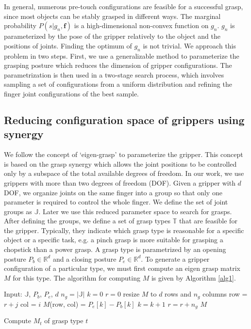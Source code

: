 In general, numerous pre-touch configurations are feasible for a successful grasp, since most objects can be stably grasped in different ways. The marginal probability $P(s|g_n,\bm{f})$ is a high-dimensional non-convex function on $g_n$. $g_n$ is parameterized by the pose of the gripper relatively to the object and the positions of joints. Finding the optimum of $g_n$ is not trivial. We approach this problem in two steps. First, we use a generalizable method to parameterize the grasping posture which reduces the dimension of gripper configurations. The parametrization is then used in a two-stage search process, which involves sampling a set of configurations from a uniform distribution and refining the finger joint configurations of the best sample.    

\subsection{Reducing configuration space of grippers using synergy }\label{sec:gripper_parametrization}

We follow the concept of `eigen-grasp'\cite{Ciocarlie2009} to parameterize the gripper. This concept is based on the grasp synergy which allows the joint positions to be controlled only by a subspace of the total available degrees of freedom. In our work, we use grippers with more than two degrees of freedom (DOF). Given a gripper with $d$ DOF, we organize joints on the same finger into a group so that only one parameter is required to control the whole finger. We define the set of joint groups as $\mathbb{J}$. Later we use this reduced parameter space to search for grasps. After defining the groups, we define a set of grasp types $\mathbb{T}$ that are feasible for the gripper. Typically, they indicate which grasp type is reasonable for a specific object or a specific task, e.g. a pinch grasp is more suitable for grasping a chopstick than a power grasp. A grasp type is parametrized by an opening posture $P_b \in\mathbb{R}^d$  and a closing posture $P_e \in\mathbb{R}^d$. To generate a gripper configuration of a particular type, we must first compute an eigen grasp matrix  $M$ for this type. The algorithm for computing $M$ is given by Algorithm \ref{alg1}. 

\begin{algorithm}
\begin{algorithmic}[1]
\STATE Input:  $\mathbb{J}$, $P_b$, $P_e$, $d$   
\STATE $n_g  =  |\mathbb{J}| $
\STATE $k = 0$ %
\STATE $r = 0$ %
\STATE resize $M$ to $d$ rows and $n_g$ columns  
\STATE row = $r + j$ 
\STATE col = $i$   
\STATE $M$(row, col) = $P_e[k] - P_b[k]$
\STATE $k = k + 1$
\ENDFOR
\STATE $r = r + n_g$
\ENDFOR
\RETURN $M$
\caption {Compute $M_t$ of grasp type $t$}
\label{alg1}
\end{algorithmic}
\end{algorithm}

